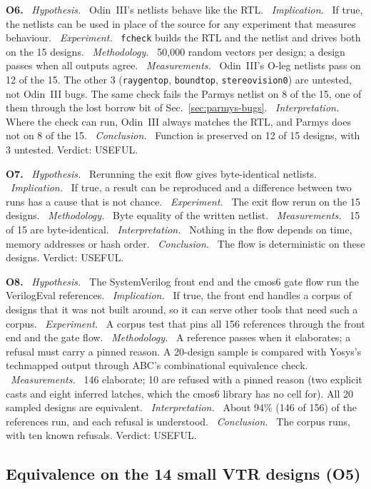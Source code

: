 \documentclass[conference]{IEEEtran}
\newcommand{\code}[1]{\texttt{#1}}
\newcommand{\argid}[1]{\par\smallskip\noindent\textbf{#1.}}
\newcommand{\ah}[1]{\ \textit{#1.}\ }
\begin{document}
\argid{O6}
\ah{Hypothesis} Odin~III's netlists behave like the RTL.
\ah{Implication} If true, the netlists can be used in place of the source for any experiment that measures behaviour.
\ah{Experiment} \code{fcheck} builds the RTL and the netlist and drives both on the 15 designs.
\ah{Methodology} 50,000 random vectors per design; a design passes when all outputs agree.
\ah{Measurements} Odin~III's O-leg netlists pass on 12 of the 15. The other 3 (\code{raygentop}, \code{boundtop}, \code{stereovision0}) are untested, not Odin~III bugs. The same check fails the Parmys netlist on 8 of the 15, one of them through the lost borrow bit of Sec.~\ref{sec:parmys-bugs}.
\ah{Interpretation} Where the check can run, Odin~III always matches the RTL, and Parmys does not on 8 of the 15.
\ah{Conclusion} Function is preserved on 12 of 15 designs, with 3 untested. Verdict: USEFUL.

\argid{O7}
\ah{Hypothesis} Rerunning the exit flow gives byte-identical netlists.
\ah{Implication} If true, a result can be reproduced and a difference between two runs has a cause that is not chance.
\ah{Experiment} The exit flow rerun on the 15 designs.
\ah{Methodology} Byte equality of the written netlist.
\ah{Measurements} 15 of 15 are byte-identical.
\ah{Interpretation} Nothing in the flow depends on time, memory addresses or hash order.
\ah{Conclusion} The flow is deterministic on these designs. Verdict: USEFUL.

\argid{O8}
\ah{Hypothesis} The SystemVerilog front end and the cmos6 gate flow run the VerilogEval references.
\ah{Implication} If true, the front end handles a corpus of designs that it was not built around, so it can serve other tools that need such a corpus.
\ah{Experiment} A corpus test that pins all 156 references through the front end and the gate flow.
\ah{Methodology} A reference passes when it elaborates; a refusal must carry a pinned reason. A 20-design sample is compared with Yosys's techmapped output through ABC's combinational equivalence check.
\ah{Measurements} 146 elaborate; 10 are refused with a pinned reason (two explicit casts and eight inferred latches, which the cmos6 library has no cell for). All 20 sampled designs are equivalent.
\ah{Interpretation} About 94\% (146 of 156) of the references run, and each refusal is understood.
\ah{Conclusion} The corpus runs, with ten known refusals. Verdict: USEFUL.

\subsection{Equivalence on the 14 small VTR designs (O5)}
\end{document}
